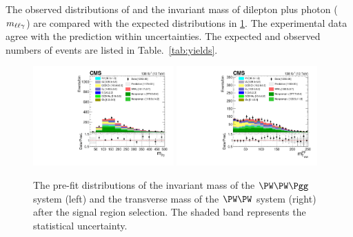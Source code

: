 The observed distributions of \mTWW and the invariant mass of dilepton plus photon ($m_{\ell\ell\gamma}$) are compared with the expected distributions in \ref{fig:plots_WWgammarun2}. The experimental data agree with the prediction within uncertainties. The expected and observed numbers of events are listed in Table.~\ref{tab:yields}.

\begin{figure}[htp]
    \begin{center}
      
      \includegraphics[width=0.48\textwidth]{unblind_SRCR/SR_prefit/can_mllg_emu.pdf}
      \includegraphics[width=0.48\textwidth]{unblind_SRCR/SR_prefit/can_mT_pf_emu.pdf}
      
    \caption{The pre-fit distributions of the invariant mass of the $\PW\PW\Pgg$ system (left) and the transverse mass of the $\PW\PW$ system (right) after the signal region selection. The shaded band represents the statistical uncertainty.}
        \label{fig:plots_WWgammarun2}
    \end{center}
\end{figure}

